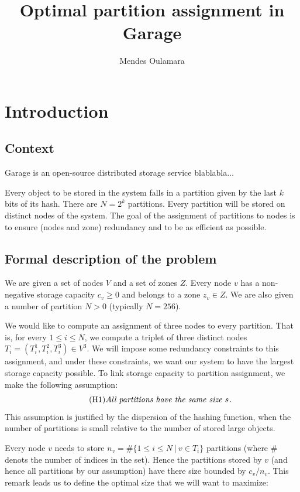 \documentclass[]{article}
\title{Optimal partition assignment in Garage}
\author{Mendes Oulamara}
\begin{document}
\maketitle

\section{Introduction}

\subsection{Context}

Garage is an open-source distributed storage service blablabla$\dots$

Every object to be stored in the system falls in a partition given by the last $k$ bits of its hash. There are $N=2^k$ partitions. Every partition will be stored on distinct nodes of the system. The goal of the assignment of partitions to nodes is to ensure (nodes and zone) redundancy and to be as efficient as possible.

\subsection{Formal description of the problem}

We are given a set of nodes $V$ and a set of zones $Z$. Every node $v$ has a non-negative storage capacity $c_v\ge 0$ and belongs to a zone $z_v\in Z$. We are also given a number of partition $N>0$ (typically $N=256$).

We would like to compute an assignment of three nodes to every partition. That is, for every $1\le i\le N$, we compute a triplet of three distinct nodes $T_i=(T_i^1, T_i^2, T_i^3) \in V^3$. We will impose some redundancy constraints to this assignment, and under these constraints, we want our system to have the largest storage capacity possible. To link storage capacity to partition assignment, we make the following assumption:
\begin{equation}
	\tag{H1}
	\text{\emph{All partitions have the same size $s$.}}
\end{equation}
This assumption is justified by the dispersion of the hashing function, when the number of partitions is small relative to the number of stored large objects.

Every node $v$ needs to store $n_v = \#\{ 1\le i\le N ~|~ v\in T_i \}$ partitions (where $\#$ denots the number of indices in the set). Hence the partitions stored by $v$ (and hence all partitions by our assumption) have there size bounded by $c_v/n_v$. This remark leads us to define the optimal size that we will want to maximize:
\end{document}
